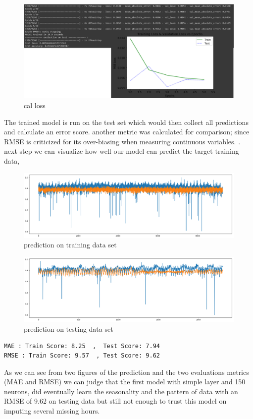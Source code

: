 %
\begin{figure}[h]
\centering
\includegraphics[scale=.4]{img/_verbose.PNG}  
\caption{cal loss}
\label{fig:verbose}
\end{figure}
%
The trained model is run on the test set which would then collect all predictions and calculate an error score. another metric was calculated for comparison; since RMSE is criticized for its over-biasing when measuring continuous variables.
\cite{Chai_Draxler_2014}.\\
next step we can visualize how well our model can predict the target training data, 
\begin{figure}[h]
\centering
\includegraphics[scale=.4]{img/prevision_sur_training.png}  
\caption{prediction on training data set}
\label{fig:verbose}
\end{figure}
\begin{figure}[h]
\centering
\includegraphics[scale=.4]{img/prevision_sur_test.png}  
\caption{prediction on testing  data set}
\label{fig:verbose}
\end{figure}
\begin{verbatim}
MAE : Train Score: 8.25  ,  Test Score: 7.94
RMSE : Train Score: 9.57  , Test Score: 9.62 
\end{verbatim}
As we can see from two figures of the prediction and the two  evaluations metrics (MAE and RMSE) we can judge that the first model with simple layer and 150 neurons, did eventually learn the seasonality and the pattern of data with an RMSE of 9.62 on testing data but still not enough to trust this model on imputing several missing hours. 

